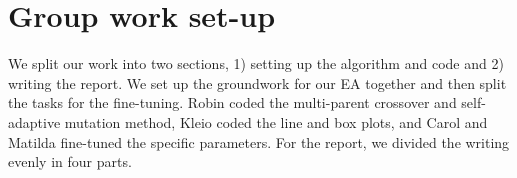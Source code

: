 \section{Group work set-up}

We split our work into two sections, 1) setting up the algorithm
and code and 2) writing the report. We set up the groundwork
for our EA together and then split the tasks for the fine-tuning.
Robin coded the multi-parent crossover and self-adaptive mutation
method, Kleio coded the line and box plots, and Carol and Matilda fine-tuned the specific parameters. For the report, we divided the
writing evenly in four parts.
